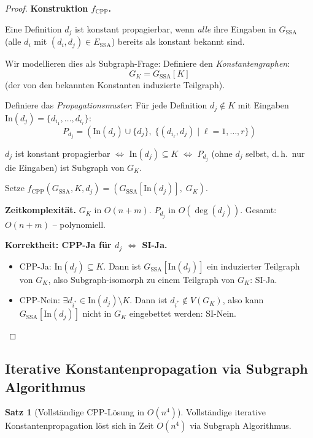 ﻿\documentclass[a4paper,12pt]{article}
\theoremstyle{definition}
\newtheorem{satz}{Satz}
\begin{document}
\begin{proof}
\textbf{Konstruktion $f_{\text{CPP}}$.}

Eine Definition $d_j$ ist konstant propagierbar, wenn \emph{alle} ihre Eingaben in $G_{\text{SSA}}$ (alle $d_i$ mit $(d_i, d_j) \in E_{\text{SSA}}$) bereits als konstant bekannt sind.

Wir modellieren dies als Subgraph-Frage: Definiere den \emph{Konstantengraphen}:
\[
G_K = G_{\text{SSA}}[K]
\]
(der von den bekannten Konstanten induzierte Teilgraph).

Definiere das \emph{Propagationsmuster}: Für jede Definition $d_j \notin K$ mit Eingaben $\text{In}(d_j) = \{d_{i_1}, \ldots, d_{i_r}\}$:
\[
P_{d_j} = (\text{In}(d_j) \cup \{d_j\},\; \{(d_{i_\ell}, d_j) \mid \ell = 1, \ldots, r\})
\]

$d_j$ ist konstant propagierbar $\Leftrightarrow$ $\text{In}(d_j) \subseteq K$ $\Leftrightarrow$ $P_{d_j}$ (ohne $d_j$ selbst, d.\,h.\ nur die Eingaben) ist Subgraph von $G_K$.

Setze $f_{\text{CPP}}(G_{\text{SSA}}, K, d_j) = (G_{\text{SSA}}[\text{In}(d_j)],\; G_K)$.

\textbf{Zeitkomplexität.}
$G_K$ in $O(n + m)$. $P_{d_j}$ in $O(\deg(d_j))$. Gesamt: $O(n + m)$ -- polynomiell.

\textbf{Korrektheit: CPP-Ja für $d_j$ $\Leftrightarrow$ SI-Ja.}
\begin{itemize}
    \item CPP-Ja: $\text{In}(d_j) \subseteq K$. Dann ist $G_{\text{SSA}}[\text{In}(d_j)]$ ein induzierter Teilgraph von $G_K$, also Subgraph-isomorph zu einem Teilgraph von $G_K$: SI-Ja.
    \item CPP-Nein: $\exists d_{i^*} \in \text{In}(d_j) \setminus K$. Dann ist $d_{i^*} \notin V(G_K)$, also kann $G_{\text{SSA}}[\text{In}(d_j)]$ nicht in $G_K$ eingebettet werden: SI-Nein.
\end{itemize}
\end{proof}

\subsection{Iterative Konstantenpropagation via Subgraph Algorithmus}

\begin{satz}[Vollständige CPP-Lösung in $O(n^4)$]
Vollständige iterative Konstantenpropagation löst sich in Zeit $O(n^4)$ via Subgraph Algorithmus.
\end{satz}
\end{document}
